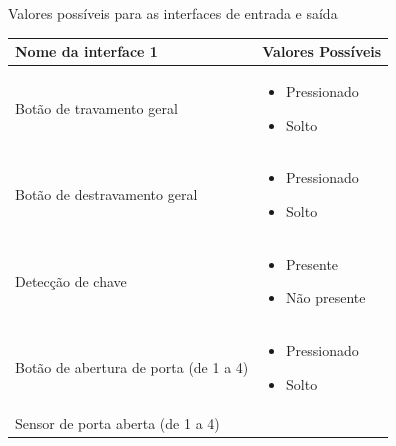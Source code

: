 
\begin{quadro}[h]
\caption{Valores possíveis para as interfaces de entrada e saída}
\label{qua:interfaces}
\begin{tabular}{|p{5cm}|p{7cm}|}
\hline
Nome da interface 1 & Valores Possíveis \\ 
\hline
Botão de travamento geral & 
\begin{itemize}[topsep=0pt, partopsep=0pt, leftmargin=*]
    \item Pressionado
    \item Solto
\end{itemize} \\
\hline
Botão de destravamento geral &
\begin{itemize}[topsep=0pt, partopsep=0pt, leftmargin=*]
    \item Pressionado
    \item Solto
\end{itemize} \\
\hline
Detecção de chave &
\begin{itemize}[topsep=0pt, partopsep=0pt, leftmargin=*]
    \item Presente
    \item Não presente
\end{itemize} \\
\hline
Botão de abertura de porta (de 1 a 4) &
\begin{itemize}[topsep=0pt, partopsep=0pt, leftmargin=*]
    \item Pressionado
    \item Solto
\end{itemize} \\
\hline
Sensor de porta aberta (de 1 a 4) &
\begin{itemize}[topsep=0pt, partopsep=0pt, leftmargin=*]

\end{itemize}
\end{tabular}
\end{quadro}
